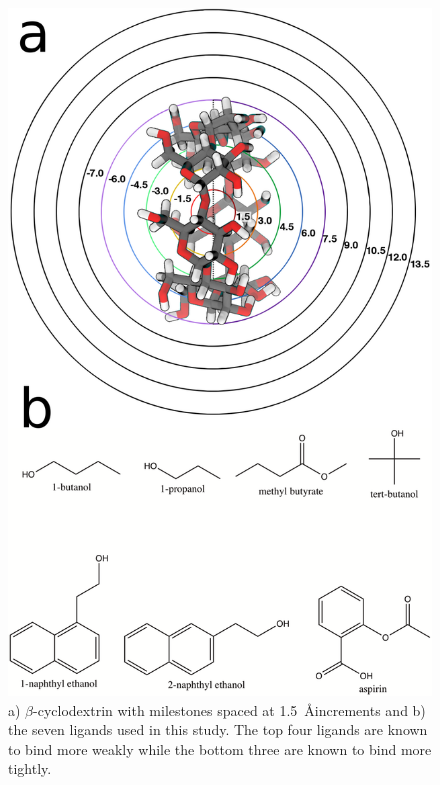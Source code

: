 \begin{figure}
    \includegraphics{images/bcdmilestones_comb_resize2.png}

	\caption{a) $\beta$-cyclodextrin with milestones spaced at 1.5~\AA increments and b) the seven ligands used in this study. The top four ligands are known to bind more weakly while the bottom three are known to bind more tightly.}
	\label{fig:BCD_ligands}
\end{figure}